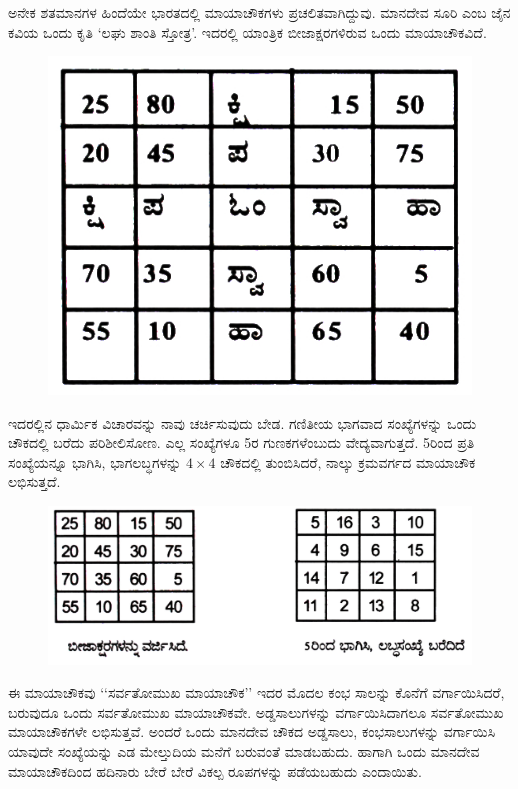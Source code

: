 ಅನೇಕ ಶತಮಾನಗಳ ಹಿಂದೆಯೇ ಭಾರತದಲ್ಲಿ ಮಾಯಾಚೌಕಗಳು ಪ್ರಚಲಿತವಾಗಿದ್ದುವು. ಮಾನದೇವ ಸೂರಿ ಎಂಬ ಜೈನ ಕವಿಯ ಒಂದು ಕೃತಿ ‘ಲಘು ಶಾಂತಿ ಸ್ತೋತ್ರ’. ಇದರಲ್ಲಿ ಯಾಂತ್ರಿಕ ಬೀಜಾಕ್ಷರಗಳಿರುವ ಒಂದು ಮಾಯಾಚೌಕವಿದೆ.
\begin{figure}[h]
\includegraphics{src/figures/chap4/fig4.8.jpg}
\end{figure}
ಇದರಲ್ಲಿನ ಧಾರ್ಮಿಕ ವಿಚಾರವನ್ನು ನಾವು ಚರ್ಚಿಸುವುದು ಬೇಡ. ಗಣಿತೀಯ ಭಾಗವಾದ ಸಂಖ್ಯೆಗಳನ್ನು ಒಂದು ಚೌಕದಲ್ಲಿ ಬರೆದು ಪರಿಶೀಲಿಸೋಣ. ಎಲ್ಲ ಸಂಖ್ಯೆಗಳೂ 5ರ ಗುಣಕಗಳೆಂಬುದು ವೇದ್ಯವಾಗುತ್ತದೆ. 5ರಿಂದ ಪ್ರತಿ ಸಂಖ್ಯೆಯನ್ನೂ ಭಾಗಿಸಿ, ಭಾಗಲಬ್ಧಗಳನ್ನು $4 \times 4$ ಚೌಕದಲ್ಲಿ ತುಂಬಿಸಿದರೆ, ನಾಲ್ಕು ಕ್ರಮವರ್ಗದ ಮಾಯಾಚೌಕ ಲಭಿಸುತ್ತದೆ.
\begin{figure}[h]
\includegraphics{src/figures/chap4/fig4.9.jpg}
\end{figure}

ಈ ಮಾಯಾಚೌಕವು ‘‘ಸರ್ವತೋಮುಖ ಮಾಯಾಚೌಕ’’ ಇದರ ಮೊದಲ ಕಂಭ ಸಾಲನ್ನು ಕೊನೆಗೆ ವರ್ಗಾಯಿಸಿದರೆ, ಬರುವುದೂ ಒಂದು ಸರ್ವತೋಮುಖ ಮಾಯಾಚೌಕವೇ. ಅಡ್ಡಸಾಲುಗಳನ್ನು ವರ್ಗಾಯಿಸಿದಾಗಲೂ ಸರ್ವತೋಮುಖ ಮಾಯಾಚೌಕಗಳೇ ಲಭಿಸುತ್ತವೆ. ಅಂದರೆ ಒಂದು ಮಾನದೇವ ಚೌಕದ ಅಡ್ಡಸಾಲು, ಕಂಭಸಾಲುಗಳನ್ನು ವರ್ಗಾಯಿಸಿ ಯಾವುದೇ ಸಂಖ್ಯೆಯನ್ನು ಎಡ ಮೇಲ್ತುದಿಯ ಮನೆಗೆ ಬರುವಂತೆ ಮಾಡಬಹುದು. ಹಾಗಾಗಿ ಒಂದು ಮಾನದೇವ ಮಾಯಾಚೌಕದಿಂದ ಹದಿನಾರು ಬೇರೆ ಬೇರೆ ವಿಕಲ್ಪ ರೂಪಗಳನ್ನು ಪಡೆಯಬಹುದು ಎಂದಾಯಿತು.

